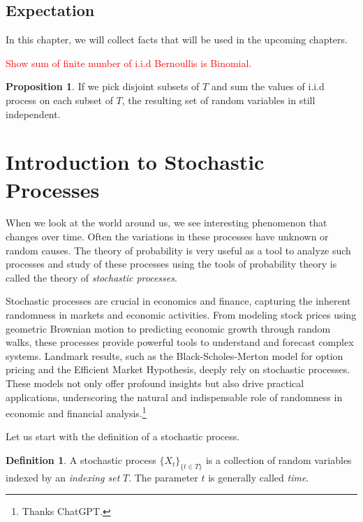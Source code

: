 \documentclass[letterpaper, 12pt]{article}
\newcommand{\1}{\mathds{1}} %
\theoremstyle{definition}
\newtheorem{proposition}[theorem]{Proposition}
\newtheorem{definition}[theorem]{Definition}
\begin{document}
\subsection{Expectation}

In this chapter, we will collect facts that will be used in the upcoming chapters.

\textcolor{red}{Show sum of finite number of i.i.d Bernoullis is Binomial.}

\begin{proposition}
\label{prp:disjsumindprv}
  If we pick disjoint subsets of $T$ and sum the values of i.i.d process on each subset of $T$, the resulting set of random variables in still independent.
\end{proposition}

\section{Introduction to Stochastic Processes}

When we look at the world around us, we see interesting phenomenon that changes over time. Often the variations in these processes have unknown or random causes. The theory of probability is very useful as a tool to analyze such processes and study of these processes using the tools of probability theory is called the theory of \emph{stochastic processes}. 

Stochastic processes are crucial in economics and finance, capturing the inherent randomness in markets and economic activities. From modeling stock prices using geometric Brownian motion to predicting economic growth through random walks, these processes provide powerful tools to understand and forecast complex systems. Landmark results, such as the Black-Scholes-Merton model for option pricing and the Efficient Market Hypothesis, deeply rely on stochastic processes. These models not only offer profound insights but also drive practical applications, underscoring the natural and indispensable role of randomness in economic and financial analysis.\footnote{Thanks ChatGPT.}

Let us start with the definition of a stochastic process.

\begin{definition}
  \label{def:sp}
  A stochastic process $\{X_t\}_{\{t \in T\}}$ is a collection of random variables indexed by an \textit{indexing set} $T$. The parameter $t$ is generally called \textit{time}.
\end{definition}
\end{document}
